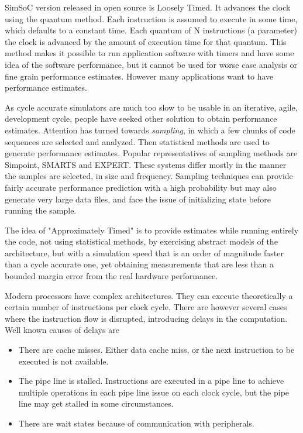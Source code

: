 \documentclass{llncs}
\begin{document}
SimSoC version released in open source is Loosely Timed. It advances
the clock using the quantum method. Each instruction is assumed to
execute in some time, which defaults to a constant time. Each quantum
of N instructions (a parameter) the clock is advanced by the amount of
execution time for that quantum. This method makes it possible to run
application software with timers and have some idea of the software
performance, but it cannot be used for worse case analysis or fine
grain performance estimates. However many applications want to have
performance estimates.

As cycle accurate simulators are much too slow to
be usable in an iterative, agile, development cycle, people have
seeked other solution to obtain performance estimates.
Attention has turned towards {\em sampling}, in which
a few chunks of code sequences are selected and
analyzed.  Then statistical methods are used to generate performance
estimates.  Popular representatives of sampling methods are
Simpoint\cite{simpoint-2004}, SMARTS\cite{smarts-2003} and
EXPERT\cite{expert-2004}. These systems differ mostly in the manner
the samples are selected, in size and frequency. Sampling techniques
can provide fairly accurate performance prediction with a high
probability but may also generate very large data files, and
face the issue of initializing state before running the sample.

The idea of "Approximately Timed" is to provide estimates while
running entirely the code, not using statistical methods, by
exercising abstract models of the architecture, but with a simulation
speed that is an order of magnitude faster than a cycle accurate one,
yet obtaining measurements that are less than a bounded margin error
from the real hardware performance.

Modern processors have complex architectures. They can execute
theoretically a certain number of instructions per clock cycle. There
are however several cases where the instruction flow is disrupted,
introducing delays in the computation. Well known causes of delays are
\begin{itemize}
\item There are cache misses. Either data cache miss, or the next
  instruction to be executed is not available.
\item
  The pipe line is stalled. Instructions are executed in a pipe line
  to achieve multiple operations in each pipe line issue on each
  clock cycle, but the pipe line may get stalled in some
  circumstances.
\item
  There are wait states because of communication with peripherals.
\end{itemize}
\end{document}
